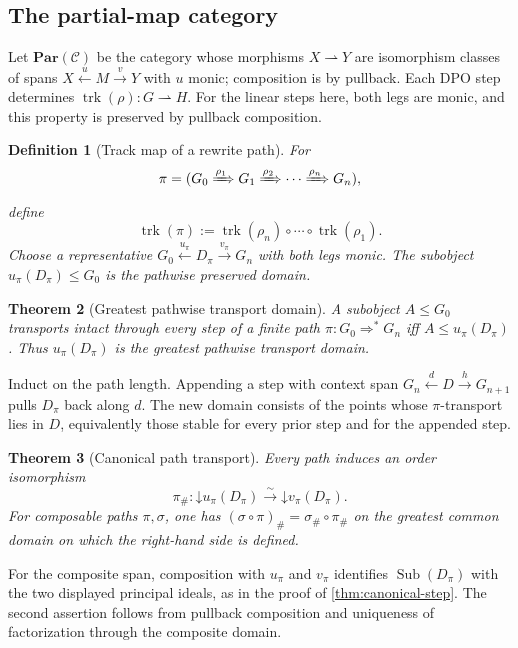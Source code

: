 \documentclass[12pt,a4paper,twoside]{extarticle}
\makeatletter
\theoremstyle{compactplain}
\newtheorem{theorem}{Theorem}[section]
\theoremstyle{compactdef}
\newtheorem{definition}[theorem]{Definition}
\renewenvironment{proof}[1][\proofname]{\par\pushQED{\qed}\normalfont
  \topsep2pt\trivlist\item[\hskip\labelsep\bfseries #1\@addpunct{.}]\ignorespaces}
 {\popQED\endtrivlist\@endpefalse}
\newcommand{\Sub}{\operatorname{Sub}}
\newcommand{\trk}{\operatorname{trk}}
\newcommand{\down}{\mathord{\downarrow}}
\makeatother
\begin{document}
\subsection{The partial-map category}
Let $\mathbf{Par}(\mathcal C)$ be the category whose morphisms $X\rightharpoonup Y$ are isomorphism classes of spans $X\xleftarrow{u}M\xrightarrow{v}Y$ with $u$ monic; composition is by pullback. Each DPO step determines $\trk(\rho):G\rightharpoonup H$. For the linear steps here, both legs are monic, and this property is preserved by pullback composition.

\begin{definition}[Track map of a rewrite path]
For
\[
\pi=(G_0\xRightarrow{\rho_1}G_1\xRightarrow{\rho_2}\cdots\xRightarrow{\rho_n}G_n),
\]
define
\[
\trk(\pi):=\trk(\rho_n)\circ\cdots\circ\trk(\rho_1).
\]
Choose a representative $G_0\xleftarrow{u_\pi}D_\pi\xrightarrow{v_\pi}G_n$ with both legs monic. The subobject $u_\pi(D_\pi)\le G_0$ is the pathwise preserved domain.
\end{definition}

\begin{theorem}[Greatest pathwise transport domain]\label{thm:path-domain}
A subobject $A\le G_0$ transports intact through every step of a finite path $\pi:G_0\Rightarrow^*G_n$ iff $A\le u_\pi(D_\pi)$. Thus $u_\pi(D_\pi)$ is the greatest pathwise transport domain.
\end{theorem}
\begin{proof}
Induct on the path length. Appending a step with context span $G_n\xleftarrow dD\xrightarrow hG_{n+1}$ pulls $D_\pi$ back along $d$. The new domain consists of the points whose $\pi$-transport lies in $D$, equivalently those stable for every prior step and for the appended step.
\end{proof}

\begin{theorem}[Canonical path transport]\label{thm:path-transport}
Every path induces an order isomorphism
\[
\pi_{\#}:\down u_\pi(D_\pi)\xrightarrow{\sim}\down v_\pi(D_\pi).
\]
For composable paths $\pi,\sigma$, one has $(\sigma\circ\pi)_{\#}=\sigma_{\#}\circ\pi_{\#}$ on the greatest common domain on which the right-hand side is defined.
\end{theorem}
\begin{proof}
For the composite span, composition with $u_\pi$ and $v_\pi$ identifies $\Sub(D_\pi)$ with the two displayed principal ideals, as in the proof of \cref{thm:canonical-step}. The second assertion follows from pullback composition and uniqueness of factorization through the composite domain.
\end{proof}
\end{document}

